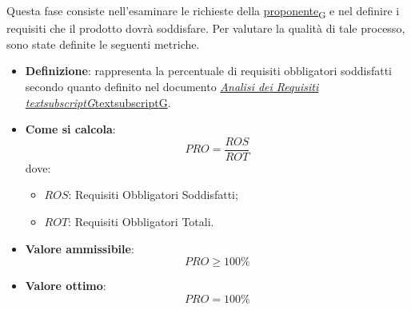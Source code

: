 Questa fase consiste nell'esaminare le richieste della \href{https://7last.github.io/docs/rtb/documentazione-interna/glossario\#proponente}{proponente\textsubscript{G}} e nel definire i requisiti che il prodotto dovrà soddisfare. Per valutare la qualità di tale processo, sono state definite le seguenti metriche.

\hypertarget{11M}{}
\begin{itemize}
	\item \textbf{Definizione}: rappresenta la percentuale di requisiti obbligatori soddisfatti secondo quanto definito nel documento \href{https://7last.github.io/docs/rtb/documentazione-interna/glossario\#analisi-dei-requisiti}{\href{https://7last.github.io/docs/rtb/documentazione-interna/glossario\#analisi-dei-requisiti}{\textit{Analisi dei Requisiti\\textsubscript{G}}textsubscript{G}}}.
	\item \textbf{Come si calcola}: \begin{equation*}PRO = \frac{ROS}{ROT}\end{equation*} dove:
		\begin{itemize}
			\item $ROS$: Requisiti Obbligatori Soddisfatti;
			\item $ROT$: Requisiti Obbligatori Totali.
		\end{itemize}
	\item \textbf{Valore ammissibile}: \begin{equation*}PRO \geq 100\%\end{equation*}
	\item \textbf{Valore ottimo}: \begin{equation*}PRO = 100\%\end{equation*}
\end{itemize}


